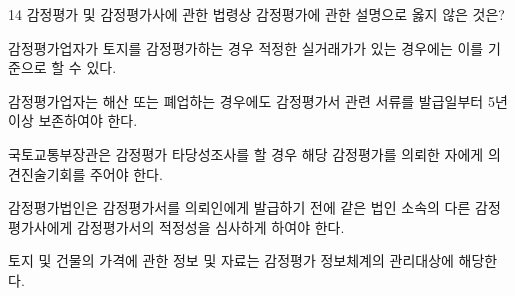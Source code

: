 \begin{question}{14}
감정평가 및 감정평가사에 관한 법령상 감정평가에 관한 설명으로 옳지 않은 것은?
\begin{choices}
  \item 감정평가업자가 토지를 감정평가하는 경우 적정한 실거래가가 있는 경우에는 이를 기준으로 할 수 있다.
  \item 감정평가업자는 해산 또는 폐업하는 경우에도 감정평가서 관련 서류를 발급일부터 5년 이상 보존하여야 한다.
  \item 국토교통부장관은 감정평가 타당성조사를 할 경우 해당 감정평가를 의뢰한 자에게 의견진술기회를 주어야 한다.
  \item 감정평가법인은 감정평가서를 의뢰인에게 발급하기 전에 같은 법인 소속의 다른 감정평가사에게 감정평가서의 적정성을 심사하게 하여야 한다.
  \item 토지 및 건물의 가격에 관한 정보 및 자료는 감정평가 정보체계의 관리대상에 해당한다.
\end{choices}
\end{question}
